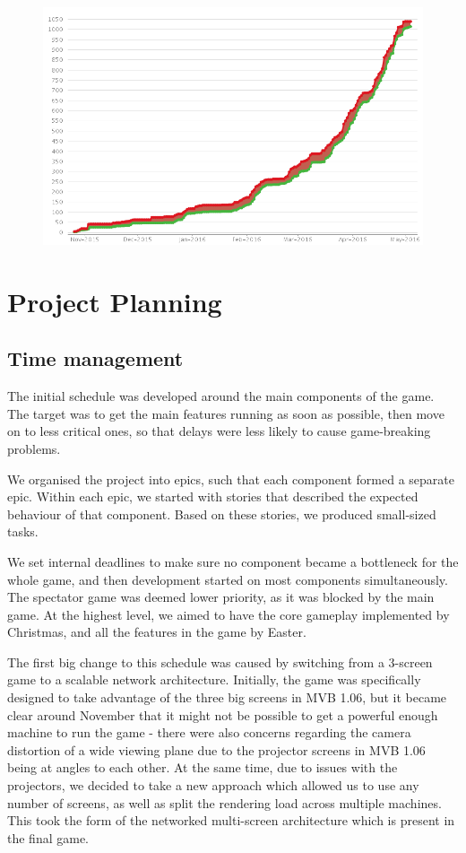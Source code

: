 \documentclass[a4paper,11pt]{article}
\begin{document}
\begin{figure}[ht]
	\centering
    \includegraphics[width=.75\textwidth]{jira_open_vs_closed}
\end{figure}

\section{Project Planning}

\subsection{Time management}
The initial schedule was developed around the main components of the game. The target was to get the main features running as soon as possible, then move on to less critical ones, so that delays were less likely to cause game-breaking problems.

We organised the project into epics, such that each component formed a separate epic. Within each epic, we started with stories that described the expected behaviour of that component. Based on these stories, we produced small-sized tasks.

We set internal deadlines to make sure no component became a bottleneck for the whole game, and then development started on most components simultaneously. The spectator game was deemed lower priority, as it was blocked by the main game. At the highest level, we aimed to have the core gameplay implemented by Christmas, and all the features in the game by Easter.

The first big change to this schedule was caused by switching from a 3-screen game to a scalable network architecture. Initially, the game was specifically designed to take advantage of the three big screens in MVB 1.06, but it became clear around November that it might not be possible to get a powerful enough machine to run the game - there were also concerns regarding the camera distortion of a wide viewing plane due to the projector screens in MVB 1.06 being at angles to each other. At the same time, due to issues with the projectors, we decided to take a new approach which allowed us to use any number of screens, as well as split the rendering load across multiple machines. This took the form of the networked multi-screen architecture which is present in the final game.
\end{document}
